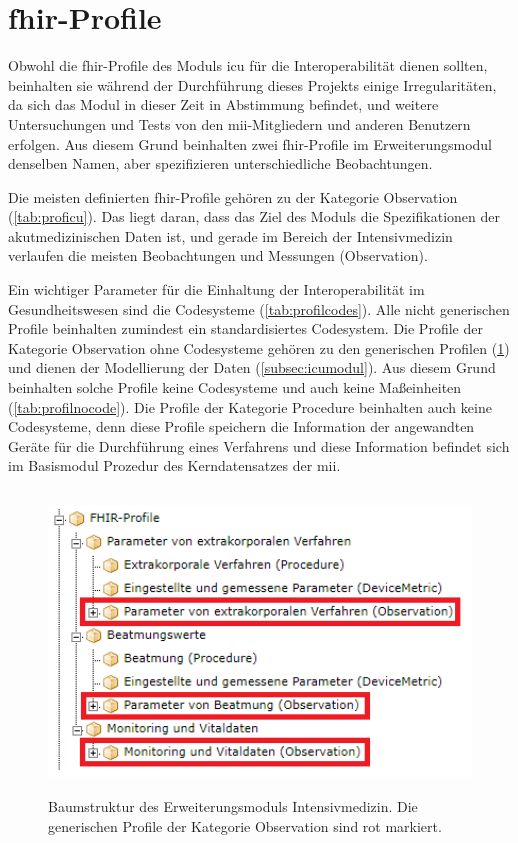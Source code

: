 \section{\acs{fhir}-Profile} \label{sec:fhiricudisc}

Obwohl die \ac{fhir}-Profile des Moduls \glqq\ac{icu}\grqq{} für die Interoperabilität dienen sollten, beinhalten sie während der Durchführung dieses Projekts einige Irregularitäten, da sich das Modul in dieser Zeit in Abstimmung befindet, und weitere Untersuchungen und Tests von den \ac{mii}-Mitgliedern und anderen Benutzern erfolgen. Aus diesem Grund beinhalten zwei \ac{fhir}-Profile im Erweiterungsmodul denselben Namen, aber spezifizieren unterschiedliche Beobachtungen.

Die meisten definierten \ac{fhir}-Profile gehören zu der Kategorie \glqq Observation\grqq{} (\ref{tab:proficu}). Das liegt daran, dass das Ziel des Moduls die Spezifikationen der akutmedizinischen Daten ist, und gerade im Bereich der Intensivmedizin verlaufen die meisten Beobachtungen und Messungen (\glqq Observation\grqq{}).

Ein wichtiger Parameter für die Einhaltung der Interoperabilität im Gesundheitswesen sind die Codesysteme (\ref{tab:profilcodes}). Alle nicht generischen Profile beinhalten zumindest ein standardisiertes Codesystem. Die Profile der Kategorie \glqq Observation\grqq{} ohne Codesysteme gehören zu den generischen Profilen (\ref{fig:icutreegenerics}) und dienen der Modellierung der Daten (\ref{subsec:icumodul}). Aus diesem Grund beinhalten solche Profile keine Codesysteme und auch keine Maßeinheiten (\ref{tab:profilnocode}). Die Profile der Kategorie \glqq Procedure\grqq{} beinhalten auch keine Codesysteme, denn diese Profile speichern die Information der angewandten Geräte für die Durchführung eines Verfahrens und diese Information befindet sich im Basismodul \glqq Prozedur\grqq{} des Kerndatensatzes der \ac{mii}.

\begin{figure}[ht]
	\centering
	\includegraphics[height=8cm]{figures/icu_modul_tree_generics}
	\caption[Generische \glqq Observation\grqq{}-Profile]{Baumstruktur des Erweiterungsmoduls \glqq Intensivmedizin\grqq{}. Die generischen Profile der Kategorie \glqq Observation\grqq{} sind rot markiert.}
	\label{fig:icutreegenerics}
\end{figure}

